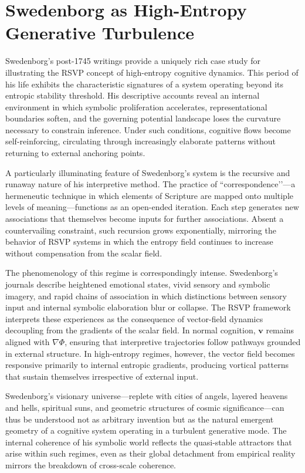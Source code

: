 \documentclass[12pt]{article}
\begin{document}
\section{Swedenborg as High-Entropy Generative Turbulence}

Swedenborg’s post-1745 writings provide a uniquely rich case study for 
illustrating the RSVP concept of high-entropy cognitive dynamics. This period 
of his life exhibits the characteristic signatures of a system operating beyond 
its entropic stability threshold.  
His descriptive accounts reveal an internal environment in which symbolic 
proliferation accelerates, representational boundaries soften, and the 
governing potential landscape loses the curvature necessary to constrain 
inference. Under such conditions, cognitive flows become self-reinforcing, 
circulating through increasingly elaborate patterns without returning to 
external anchoring points.

A particularly illuminating feature of Swedenborg’s system is the recursive and 
runaway nature of his interpretive method. The practice of ``correspondence’’—a 
hermeneutic technique in which elements of Scripture are mapped onto multiple 
levels of meaning—functions as an open-ended iteration. Each step generates 
new associations that themselves become inputs for further associations.  
Absent a countervailing constraint, such recursion grows exponentially, 
mirroring the behavior of RSVP systems in which the entropy field continues to 
increase without compensation from the scalar field.  

The phenomenology of this regime is correspondingly intense. Swedenborg’s 
journals describe heightened emotional states, vivid sensory and symbolic 
imagery, and rapid chains of association in which distinctions between 
sensory input and internal symbolic elaboration blur or collapse.  
The RSVP framework interprets these experiences as the consequence of 
vector-field dynamics decoupling from the gradients of the scalar field.  
In normal cognition, $\mathbf{v}$ remains aligned with $\nabla \Phi$, ensuring 
that interpretive trajectories follow pathways grounded in external structure.  
In high-entropy regimes, however, the vector field becomes responsive primarily 
to internal entropic gradients, producing vortical patterns that sustain 
themselves irrespective of external input.

Swedenborg’s visionary universe—replete with cities of angels, layered heavens 
and hells, spiritual suns, and geometric structures of cosmic significance—can 
thus be understood not as arbitrary invention but as the natural emergent 
geometry of a cognitive system operating in a turbulent generative mode.  
The internal coherence of his symbolic world reflects the quasi-stable 
attractors that arise within such regimes, even as their global detachment from 
empirical reality mirrors the breakdown of cross-scale coherence.
\end{document}
